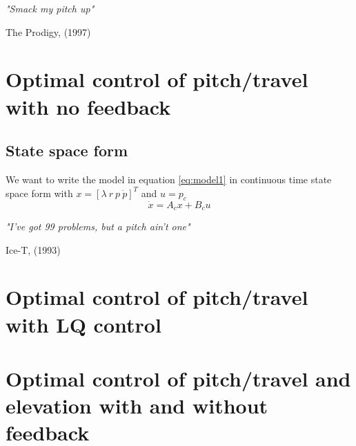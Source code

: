 \documentclass[a4paper,12pt]{article}
\numberwithin{equation}{subsection}
\begin{document}
\tableofcontents

\newpage
\epigraph{\textit{"Smack my pitch up"}}{The Prodigy, (1997)}
\section{Optimal control of pitch/travel with no feedback}
\subsection{State space form}
We want to write the model in equation \ref{eq:model1} in continuous time state space form with $x = \left[ \lambda\  r\  p\  \dot{p}\right]^T$ and $u=p_c$
\begin{equation}\label{eq:model1}
\dot{x}=A_cx+B_cu
\end{equation}

\newpage
\epigraph{\textit{"I've got 99 problems, but a pitch ain't one"}}{Ice-T, (1993)}
\section{Optimal control of pitch/travel with LQ control}
\newpage
\section{Optimal control of pitch/travel and elevation with and without feedback}
\newpage
\end{document}
